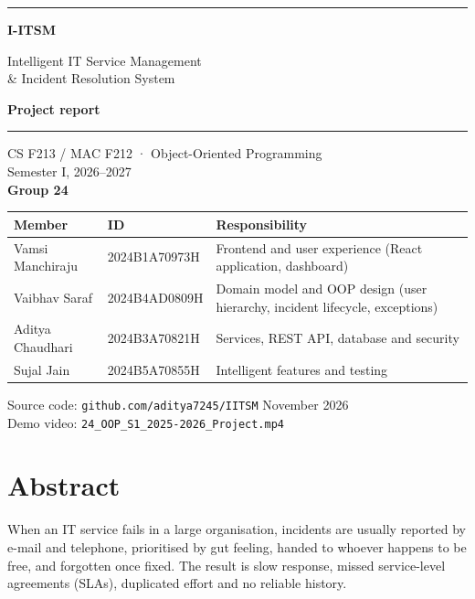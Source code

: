 \documentclass[11pt,a4paper]{article}
\begin{document}
\begin{titlepage}
\vspace*{2.2cm}
{\color{accent}\rule{\linewidth}{1.4pt}}\par\vspace{16pt}
{\fontsize{46}{50}\selectfont\bfseries\color{ink} I-ITSM}\par\vspace{8pt}
{\LARGE Intelligent IT Service Management\\[2pt] \& Incident Resolution System}\par\vspace{18pt}
{\Large\color{accent}\bfseries Project report}\par\vspace{16pt}
{\color{accent}\rule{\linewidth}{1.4pt}}\par\vspace{26pt}
{\large CS F213 / MAC F212 · Object-Oriented Programming\\ Semester I, 2026–2027\\[8pt] \textbf{Group 24}}\par\vspace{26pt}
\begin{tabularx}{\linewidth}{@{}l l X@{}}
\toprule
\textbf{Member} & \textbf{ID} & \textbf{Responsibility} \\ \midrule
Vamsi Manchiraju & 2024B1A70973H & Frontend and user experience (React application, dashboard) \\
Vaibhav Saraf & 2024B4AD0809H & Domain model and OOP design (user hierarchy, incident lifecycle, exceptions) \\
Aditya Chaudhari & 2024B3A70821H & Services, REST API, database and security \\
Sujal Jain & 2024B5A70855H & Intelligent features and testing \\ \bottomrule
\end{tabularx}
\vfill
{\small\color{muted} Source code: \texttt{github.com/aditya7245/IITSM} \hfill November 2026\\[2pt] Demo video: \texttt{24\_OOP\_S1\_2025-2026\_Project.mp4}}
\end{titlepage}

\section*{Abstract}
When an IT service fails in a large organisation, incidents are usually reported by e-mail and telephone, prioritised by gut feeling, handed to whoever happens to be free, and forgotten once fixed. The result is slow response, missed service-level agreements (SLAs), duplicated effort and no reliable history.
\end{document}

